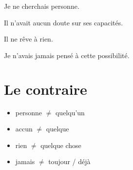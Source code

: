 Je ne cherchais personne.

Il n'avait aucun doute sur ses capacités.

Il ne rêve à rien.

Je n'avais jamais pensé à cette possibilité.



\section{Le contraire}


\begin{itemize}
\item personne $\ne$ quelqu'un
\item accun $\ne$ quelque
\item rien $\ne$ quelque chose
\item jamais $\ne$ toujour / déjà
\end{itemize}

